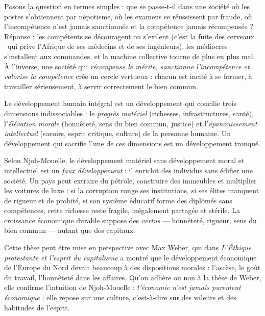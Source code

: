 \documentclass[11pt]{article}
\newcommand{\cle}[1]{{\popxbold\color{popdark}#1}}
\begin{document}
Posons la question en termes simples : que se passe-t-il dans une société où les postes s'obtiennent par népotisme, où les examens se réussissent par fraude, où l'incompétence n'est jamais sanctionnée et la compétence jamais récompensée ? Réponse : les compétents se découragent ou s'exilent (c'est la \guillemotleft fuite des cerveaux \guillemotright\ qui prive l'Afrique de ses médecins et de ses ingénieurs), les médiocres s'installent aux commandes, et la machine collective tourne de plus en plus mal. À l'inverse, une société qui \emph{récompense le mérite, sanctionne l'incompétence et valorise la compétence} crée un cercle vertueux : chacun est incité à se former, à travailler sérieusement, à servir correctement le bien commun.

\begin{definition}
Le \cle{développement humain intégral} est un développement qui concilie trois dimensions indissociables : le \emph{progrès matériel} (richesses, infrastructures, santé), l'\emph{élévation morale} (honnêteté, sens du bien commun, justice) et l'\emph{épanouissement intellectuel} (savoirs, esprit critique, culture) de la personne humaine. Un développement qui sacrifie l'une de ces dimensions est un développement tronqué.
\end{definition}

\begin{propriete}
Selon Njoh-Mouelle, le développement matériel sans développement moral et intellectuel est un \emph{faux développement} : il enrichit des individus sans édifier une société. Un pays peut extraire du pétrole, construire des immeubles et multiplier les voitures de luxe : si la corruption ronge ses institutions, si ses élites manquent de rigueur et de probité, si son système éducatif forme des diplômés sans compétences, cette richesse reste fragile, inégalement partagée et stérile. La croissance économique durable suppose des \emph{vertus} — honnêteté, rigueur, sens du bien commun — autant que des capitaux.
\end{propriete}

Cette thèse peut être mise en perspective avec Max Weber, qui dans \emph{L'Éthique protestante et l'esprit du capitalisme} a montré que le développement économique de l'Europe du Nord devait beaucoup à des dispositions morales : l'ascèse, le goût du travail, l'honnêteté dans les affaires. Qu'on adhère ou non à la thèse de Weber, elle confirme l'intuition de Njoh-Mouelle : \emph{l'économie n'est jamais purement économique} ; elle repose sur une culture, c'est-à-dire sur des valeurs et des habitudes de l'esprit.
\end{document}
